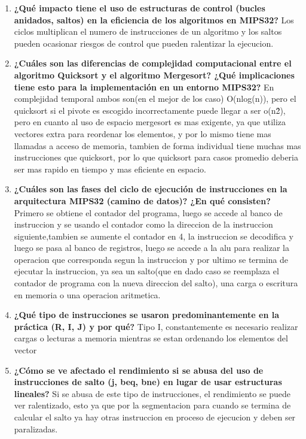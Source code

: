 \documentclass{article}
\begin{document}
\begin{enumerate}
    \item \textbf{¿Qué impacto tiene el uso de estructuras de control (bucles anidados, saltos) en la eficiencia de los algoritmos en MIPS32?}
    Los ciclos multiplican el numero de instrucciones de un algoritmo y los saltos pueden ocasionar riesgos de control que pueden ralentizar la ejecucion.
    
    \item \textbf{¿Cuáles son las diferencias de complejidad computacional entre el algoritmo Quicksort y el algoritmo Mergesort? ¿Qué implicaciones tiene esto para la implementación en un entorno MIPS32?}
    En complejidad temporal ambos son(en el mejor de los caso) O(nlog(n)), pero el quicksort si el pivote es escogido incorrectamente puede llegar a ser o(n\^2), pero en cuanto al uso de espacio mergesort es mas exigente, ya que utiliza vectores extra para reordenar los elementos, y por lo mismo tiene mas llamadas a acceso de memoria, tambien de forma individual tiene muchas mas instrucciones que quicksort, por lo que quicksort para casos promedio deberia ser mas rapido en tiempo y mas eficiente en espacio.
    \item \textbf{¿Cuáles son las fases del ciclo de ejecución de instrucciones en la arquitectura MIPS32 (camino de datos)? ¿En qué consisten?}
    Primero se obtiene el contador del programa, luego se accede al banco de instruccion y se usando el contador como la direccion de la instruccion siguiente,tambien se aumente el contador en 4, la instruccion se decodifica y luego se pasa al banco de registros, luego se accede a la alu para realizar la operacion que corresponda segun la instruccion y por ultimo se termina de ejecutar la instruccion, ya sea un salto(que en dado caso se reemplaza el contador de programa con la nueva direccion del salto), una carga o escritura en memoria o una operacion aritmetica.
    
    
    \item \textbf{¿Qué tipo de instrucciones se usaron predominantemente en la práctica (R, I, J) y por qué?}
    Tipo I, constantemente es necesario realizar cargas o lecturas a memoria mientras se estan ordenando los elementos del vector
    \item \textbf{¿Cómo se ve afectado el rendimiento si se abusa del uso de instrucciones de salto (j, beq, bne) en lugar de usar estructuras lineales?}
    Si se abusa de este tipo de instrucciones, el rendimiento se puede ver ralentizado, esto ya que por la segmentacion para cuando se termina de calcular el salto ya hay otras instruccion en proceso de ejecucion y deben ser paralizadas.
    

\end{enumerate}
\end{document}
